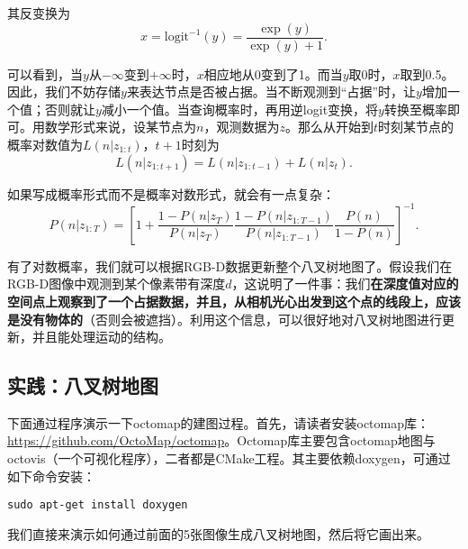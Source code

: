 其反变换为
\begin{equation}
x = \mathrm{logit}^{-1}(y) = \frac{\exp(y)}{\exp(y)+1}.
\end{equation}

\enlargethispage{4pt}
可以看到，当$y$从$-\infty$变到$+\infty$时，$x$相应地从0变到了1。而当$y$取0时，$x$取到0.5。因此，我们不妨存储$y$来表达节点是否被占据。当不断观测到“占据”时，让$y$增加一个值；否则就让$y$减小一个值。当查询概率时，再用逆logit变换，将$y$转换至概率即可。用数学形式来说，设某节点为$n$，观测数据为$z$。那么从开始到$t$时刻某节点的概率对数值为$L(n|z_{1:t})$，$t+1$时刻为
\clearpage
\begin{equation}
L(n|z_{1:t+1}) = L(n|z_{1:t-1}) + L(n|z_{t}).
\end{equation}

如果写成概率形式而不是概率对数形式，就会有一点复杂：
\begin{equation}
P(n|z_{1:T}) =  \left[ 1+ \frac{1-P(n|z_T)}{P(n|z_T)} \frac{1-P(n|z_{1:T-1})}{P(n|z_{1:T-1})} \frac{P(n)}{1-P(n)} \right]^{-1}.
\end{equation}

有了对数概率，我们就可以根据RGB-D数据更新整个八叉树地图了。假设我们在RGB-D图像中观测到某个像素带有深度$d$，这说明了一件事：我们\textbf{在深度值对应的空间点上观察到了一个占据数据，并且，从相机光心出发到这个点的线段上，应该是没有物体的}（否则会被遮挡）。利用这个信息，可以很好地对八叉树地图进行更新，并且能处理运动的结构。

\subsection{实践：八叉树地图}
下面通过程序演示一下octomap的建图过程。首先，请读者安装octomap库：\url{https://github.com/OctoMap/octomap}。Octomap库主要包含octomap地图与octovis（一个可视化程序），二者都是CMake工程。其主要依赖doxygen，可通过如下命令安装：
\begin{lstlisting}
sudo apt-get install doxygen 
\end{lstlisting}

我们直接来演示如何通过前面的5张图像生成八叉树地图，然后将它画出来。


